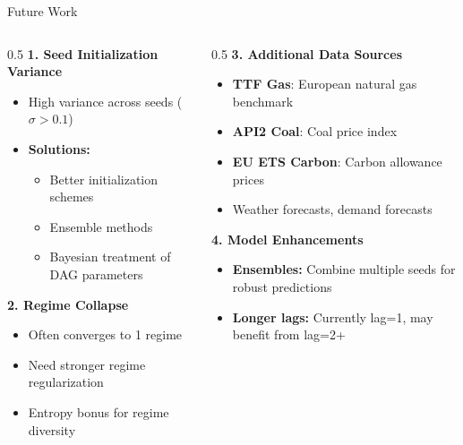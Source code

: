 \documentclass[aspectratio=169]{beamer}
\begin{document}
\begin{frame}{Future Work}
\begin{columns}
\begin{column}{0.5\textwidth}
\textbf{1. Seed Initialization Variance}
\begin{itemize}
    \item High variance across seeds ($\sigma > 0.1$)
    \item \textbf{Solutions:}
    \begin{itemize}
        \item Better initialization schemes
        \item Ensemble methods
        \item Bayesian treatment of DAG parameters
    \end{itemize}
\end{itemize}

\vspace{0.3cm}
\textbf{2. Regime Collapse}
\begin{itemize}
    \item Often converges to 1 regime
    \item Need stronger regime regularization
    \item Entropy bonus for regime diversity
\end{itemize}
\end{column}

\begin{column}{0.5\textwidth}
\textbf{3. Additional Data Sources}
\begin{itemize}
    \item \textbf{TTF Gas}: European natural gas benchmark
    \item \textbf{API2 Coal}: Coal price index
    \item \textbf{EU ETS Carbon}: Carbon allowance prices
    \item Weather forecasts, demand forecasts
\end{itemize}

\textbf{4. Model Enhancements}
\begin{itemize}
    \item \textbf{Ensembles:} Combine multiple seeds for robust predictions
    \item \textbf{Longer lags:} Currently lag=1, may benefit from lag=2+
\end{itemize}
\end{column}
\end{columns}
\end{frame}
\end{document}
